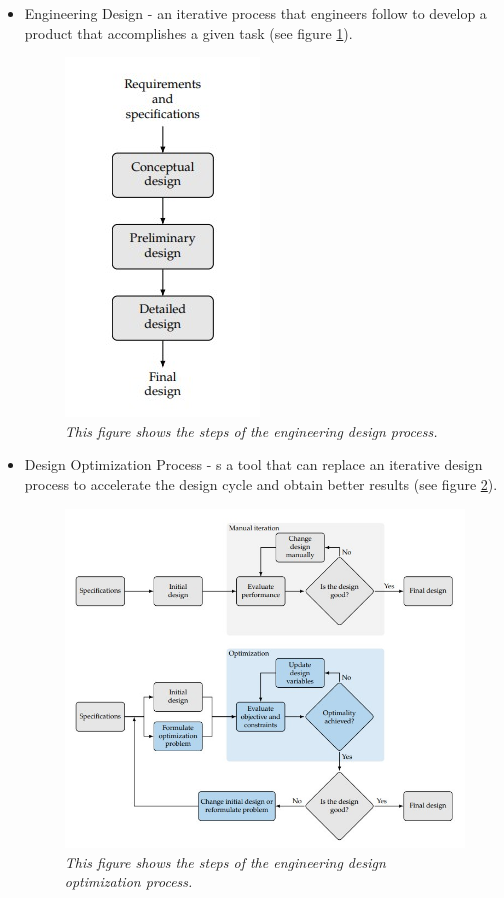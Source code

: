\documentclass{journal}
\begin{document}
	\begin{itemize}
	
		\item Engineering Design - an iterative process that engineers follow to
		develop a product that accomplishes a given task (see figure \ref{fig:design-process}).
		
		\begin{figure}[H]
			\centering
			\includegraphics[scale=0.75]{../graphics/design_process}
			\caption{\emph{This figure shows the steps of the engineering design process.}}
			\label{fig:design-process}
		\end{figure}
	
		\item Design Optimization Process - s a tool that can replace an iterative design
		process to accelerate the design cycle and obtain better results (see figure \ref{fig:optimization}).
		
		\begin{figure}[H]
			\centering
			\includegraphics[scale=0.5]{../graphics/optimization_process}
			\caption{\emph{This figure shows the steps of the engineering design optimization process.}}
			\label{fig:optimization}
		\end{figure}
	

\end{itemize}
\end{document}
